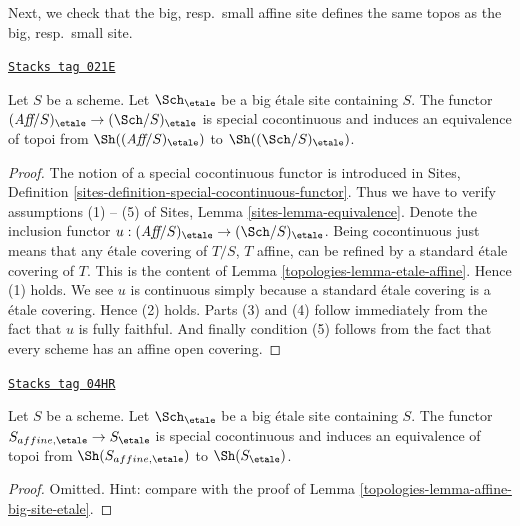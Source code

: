 Next, we check that the big, resp.\ small affine site defines the same
topos as the big, resp.\ small site.

\begin{lemma}
\label{topologies-lemma-affine-big-site-etale}
\href{https://stacks.math.columbia.edu/tag/021E}{\texttt{Stacks tag 021E}}

Let $S$ be a scheme. Let $\Sch_\etale$ be a big \'etale
site containing $S$.
The functor
$(\textit{Aff}/S)_\etale \to (\Sch/S)_\etale$
is special cocontinuous and induces an equivalence of topoi from
$\Sh((\textit{Aff}/S)_\etale)$ to
$\Sh((\Sch/S)_\etale)$.
\end{lemma}

\begin{proof}

The notion of a special cocontinuous functor is introduced in
Sites, Definition \ref{sites-definition-special-cocontinuous-functor}.
Thus we have to verify assumptions (1) -- (5) of
Sites, Lemma \ref{sites-lemma-equivalence}.
Denote the inclusion functor
$u : (\textit{Aff}/S)_\etale \to (\Sch/S)_\etale$.
Being cocontinuous just means that any \'etale covering of
$T/S$, $T$ affine, can be refined by a standard \'etale covering of $T$.
This is the content of
Lemma \ref{topologies-lemma-etale-affine}.
Hence (1) holds. We see $u$ is continuous simply because a standard
\'etale covering is a \'etale covering. Hence (2) holds.
Parts (3) and (4) follow immediately from the fact that $u$ is
fully faithful. And finally condition (5) follows from the
fact that every scheme has an affine open covering.
\end{proof}

\begin{lemma}[Alternative]
\label{topologies-lemma-alternative}
\href{https://stacks.math.columbia.edu/tag/04HR}{\texttt{Stacks tag 04HR}}

Let $S$ be a scheme. Let $\Sch_\etale$ be a big \'etale
site containing $S$. The functor $S_{affine, \etale} \to S_\etale$
is special cocontinuous and induces an equivalence of topoi from
$\Sh(S_{affine, \etale})$ to $\Sh(S_\etale)$.
\end{lemma}

\begin{proof}

Omitted. Hint: compare with the proof of
Lemma \ref{topologies-lemma-affine-big-site-etale}.
\end{proof}

